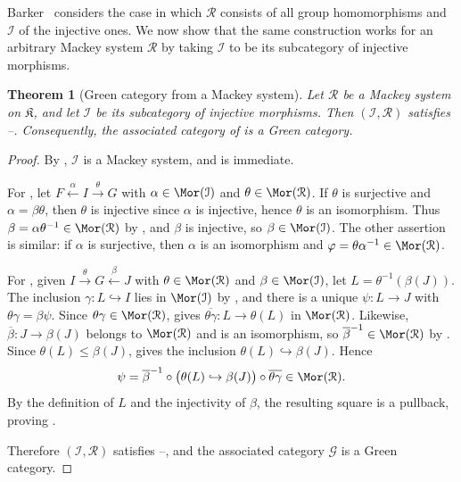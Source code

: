 \documentclass{amsart}
\numberwithin{equation}{section}%
\newtheorem{Thm}[equation]{Theorem}
\theoremstyle{remark}
\theoremstyle{definition}
\begin{document}
%
Barker~\cite[Ex.~2.6]{Barker16b} considers the case in which
$\mathcal R$ consists of all group homomorphisms and $\mathcal I$
of the injective ones. We now show that the same construction works
for an arbitrary Mackey system $\mathcal R$ by taking $\mathcal I$
to be its subcategory of injective morphisms.
%
\begin{Thm}[Green category from a Mackey system]
\label{thm:green-category-from-mackey-system}
Let $\mathcal R$ be a Mackey system on $\mathfrak K$, and let
$\mathcal I$ be its subcategory of injective morphisms.
Then $(\mathcal I,\mathcal R)$ satisfies --.
Consequently, the associated category of
 is a Green category.
\end{Thm}
%
\begin{proof}
By , $\mathcal I$ is a Mackey system, and  is immediate.

For , let
$F \xleftarrow{\alpha} I \xrightarrow{\theta} G$
with $\alpha\in\Mor(\mathcal I)$ and $\theta\in\Mor(\mathcal R)$.
If $\theta$ is surjective and $\alpha=\beta\theta$, then $\theta$ is injective since $\alpha$ is injective, hence $\theta$ is an isomorphism. Thus
$\beta=\alpha\theta^{-1}\in\Mor(\mathcal R)$ by , and $\beta$ is injective, so $\beta\in\Mor(\mathcal I)$.
The other assertion is similar: if $\alpha$ is surjective, then $\alpha$ is an isomorphism and
$\varphi=\theta\alpha^{-1}\in\Mor(\mathcal R)$.

For , given
$I\xrightarrow{\theta}G\xleftarrow{\beta}J$
with $\theta\in\Mor(\mathcal R)$ and $\beta\in\Mor(\mathcal I)$, let
$L=\theta^{-1}(\beta(J))$.
The inclusion $\gamma:L\hookrightarrow I$ lies in $\Mor(\mathcal I)$ by , and there is a unique
$\psi:L\to J$ with $\theta\gamma=\beta\psi$. Since $\theta\gamma\in\Mor(\mathcal R)$,  gives
$\overline{\theta\gamma}\colon L\to\theta(L)$ in
$\Mor(\mathcal R)$. Likewise,
$\overline\beta\colon J\to\beta(J)$ belongs to
$\Mor(\mathcal R)$ and is an isomorphism, so
$\overline\beta^{-1}\in\Mor(\mathcal R)$ by .
Since $\theta(L)\leq\beta(J)$,  gives the inclusion
$\theta(L)\hookrightarrow\beta(J)$. Hence
\[
\psi=
\overline\beta^{-1}\circ
\bigl(\theta(L)\hookrightarrow\beta(J)\bigr)\circ
\overline{\theta\gamma}
\in\Mor(\mathcal R).
\]
By the definition of $L$ and the injectivity of $\beta$, the resulting
square is a pullback, proving .

Therefore $(\mathcal I,\mathcal R)$ satisfies --, and the associated category $\mathcal G$ is a Green category.
\end{proof}
\end{document}
